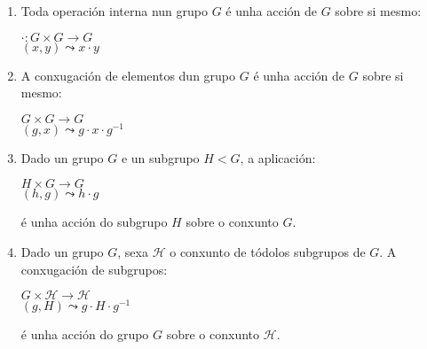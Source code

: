 \documentclass[twoside]{report}
\theoremstyle{mystyle}
\begin{document}
\begin{enumerate}
    
    \item Toda operación interna nun grupo $G$ é unha acción de $G$ sobre si mesmo:
    
    \begin{center}
    $\cdot : G \times G \longrightarrow G$ \\
    \vspace{2mm}
    \hspace{6mm} $(x,y) \leadsto x \cdot y$
    \end{center}  
    
    \item A conxugación de elementos dun grupo $G$ é unha acción de $G$ sobre si mesmo:
    
    \begin{center}
    $G \times G \longrightarrow G$ \\
    \vspace{2mm}
    \hspace{8mm} $(g,x) \leadsto g \cdot x \cdot g^{-1}$
    \end{center}  
    
    \item Dado un grupo $G$ e un subgrupo $H < G$, a aplicación:
    
    \begin{center}
    $H \times G \longrightarrow G$ \\
    \vspace{2mm}
    \hspace{1mm} $(h,g) \leadsto h \cdot g$
    \end{center}  
    
    é unha acción do subgrupo $H$ sobre o conxunto $G$.
    
    \item Dado un grupo $G$, sexa $\mathscr{H}$ o conxunto de tódolos subgrupos de $G$. A conxugación de subgrupos:
    
    \begin{center}
    $G \times \mathscr{H} \longrightarrow \mathscr{H}$ \\
    \vspace{2mm}
    \hspace{8mm} $(g,H) \leadsto g \cdot H \cdot g^{-1}$
    \end{center}  
    
    é unha acción do grupo $G$ sobre o conxunto $\mathscr{H}$.
    
\end{enumerate}
\end{document}

